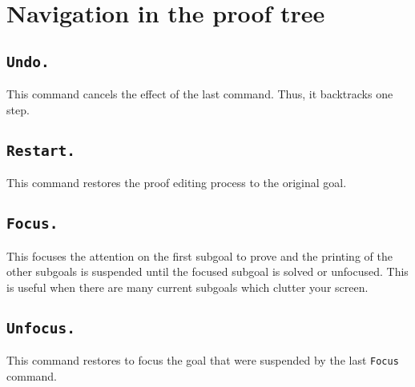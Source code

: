 \section{Navigation in the proof tree}

\subsection[\tt Undo.]{\tt Undo.}

This command cancels the effect of the last command.  Thus, it
backtracks one step.


\subsection[\tt Restart.]{\tt Restart.}
This command restores the proof editing process to the original goal.

\begin{ErrMsgs}
\item {}
\end{ErrMsgs}

\subsection[\tt Focus.]{\tt Focus.}
This focuses the attention on the first subgoal to prove and the printing
of the other subgoals is suspended until the focused subgoal is
solved or unfocused. This is useful when there are many current
subgoals which clutter your screen.


\subsection[\tt Unfocus.]{\tt Unfocus.}
This command restores to focus the goal that were suspended by the
last {\tt Focus} command.

